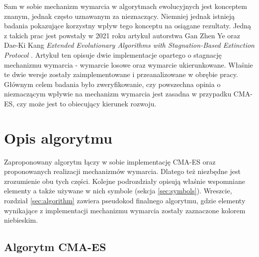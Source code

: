 \documentclass[10pt]{article}
\begin{document}
Sam w sobie mechanizm wymarcia w algorytmach ewolucyjnych jest konceptem znanym, jednak często uznawanym za nieznaczący. Niemniej jednak istnieją badania pokazujące korzystny wpływ tego konceptu na osiągane rezultaty. Jedną z takich prac jest powstały w 2021 roku artykuł autorstwa Gan Zhen Ye oraz Dae-Ki Kang \textit{Extended Evolutionary Algorithms with Stagnation-Based Extinction Protocol} \cite{ye2021}. Artykuł ten opisuje dwie implementacje opartego o stagnację mechanizmu wymarcia - wymarcie losowe oraz wymarcie ukierunkowane. Właśnie te dwie wersje zostały zaimplementowane i przeanalizowane w obrębie pracy. Głównym celem badania było zweryfikowanie, czy powszechna opinia o nieznaczącym wpływie na mechanizm wymarcia jest zasadna w przypadku CMA-ES, czy może jest to obiecujący kierunek rozwoju.


\section{Opis algorytmu}

Zaproponowany algorytm łączy w sobie implementację CMA-ES oraz proponowanych realizacji mechanizmów wymarcia. Dlatego też niezbędne jest zrozumienie obu tych części. Kolejne podrozdziały opisują właśnie wspomniane elementy a także używane w nich symbole (sekcja \ref{sec:symbols}). Wreszcie, rozdział \ref{sec:algorithm} zawiera pseudokod finalnego algorytmu, gdzie elementy wynikające z implementacji mechanizmu wymarcia zostały zaznaczone kolorem niebieskim. 

\subsection{Algorytm CMA-ES}
\end{document}
